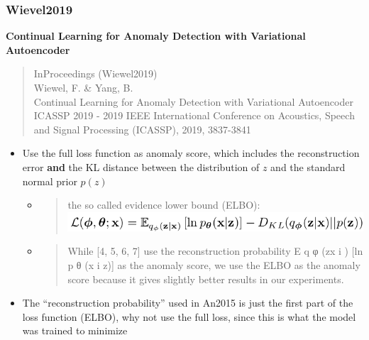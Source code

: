 \documentclass[
  letterpaper,
  DIV=11,
  numbers=noendperiod]{scrartcl}
\begin{document}
\hypertarget{wievel2019}{%
\subsubsection{Wievel2019}\label{wievel2019}}

\textbf{Continual Learning for Anomaly Detection with Variational
Autoencoder}

\begin{quote}
InProceedings (Wiewel2019)\\
Wiewel, F. \& Yang, B.\\
Continual Learning for Anomaly Detection with Variational Autoencoder\\
ICASSP 2019 - 2019 IEEE International Conference on Acoustics, Speech
and Signal Processing (ICASSP), 2019, 3837-3841
\end{quote}

\begin{itemize}
\item
  Use the full loss function as anomaly score, which includes the
  reconstruction error \textbf{and} the KL distance between the
  distribution of \(z\) and the standard normal prior \(p(z)\)

  \begin{itemize}
  \item
    \begin{quote}
    the so called evidence lower bound (ELBO):
    \includegraphics{img/2023-01-16-17-50-43.png}
    \end{quote}
  \item
    \begin{quote}
    While {[}4, 5, 6, 7{]} use the reconstruction probability E q φ
    (z\textbar x i ) {[}ln p θ (x i \textbar z){]} as the anomaly score,
    we use the ELBO as the anomaly score because it gives slightly
    better results in our experiments.
    \end{quote}
  \end{itemize}
\item
  The ``reconstruction probability'' used in An2015 is just the first
  part of the loss function (ELBO), why not use the full loss, since
  this is what the model was trained to minimize
\end{itemize}
\end{document}
